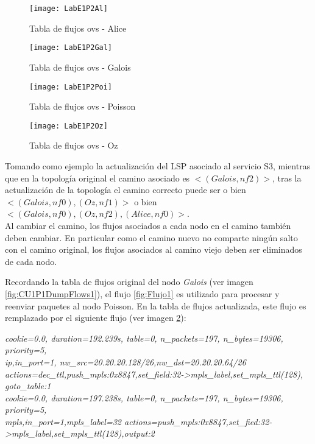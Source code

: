 \begin{figure}[h] 
\centering    
\texttt{[image: LabE1P2Al]}
\caption[Tabla de flujos ovs - Alice]{Tabla de flujos ovs - Alice}
\label{fig:CU1P2DumpFlows1}
\end{figure}

\newpage
\begin{figure}[h] 
\centering    
\texttt{[image: LabE1P2Gal]}
\caption[Tabla de flujos ovs - Galois]{Tabla de flujos ovs - Galois}
\label{fig:CU1P2DumpFlows2}
\end{figure}

\begin{figure}[h] 
\centering    
\texttt{[image: LabE1P2Poi]}
\caption[Tabla de flujos ovs - Poisson]{Tabla de flujos ovs - Poisson}
\label{fig:CU1P2DumpFlows3}
\end{figure}

\newpage
\begin{figure}[ht!] 
\centering    
\texttt{[image: LabE1P2Oz]}
\caption[Tabla de flujos ovs - Oz]{Tabla de flujos ovs - Oz}
\label{fig:CU1P2DumpFlows4}
\end{figure}

Tomando como ejemplo la actualizaci\'on del LSP asociado al servicio S3, mientras que en la topolog\'ia original el camino asociado es $<(Galois, nf2)>$, tras la actualizaci\'on de la topolog\'ia el camino correcto puede ser o bien $<(Galois, nf0),(Oz, nf1)>$ o bien \\ $<(Galois, nf0), (Oz, nf2), (Alice, nf0)>$.\\

Al cambiar el camino, los flujos asociados a cada nodo en el camino tambi\'en deben cambiar. En particular como el camino nuevo no comparte ning\'un salto con el camino original, los flujos asociados al camino viejo deben ser eliminados de cada nodo.

Recordando la tabla de flujos original del nodo \textit{Galois} (ver imagen \ref{fig:CU1P1DumpFlows1}), el flujo \ref{fig:Flujo1} es utilizado para procesar y reenviar paquetes al nodo Poisson. En la tabla de flujos actualizada, este flujo es remplazado por el siguiente flujo (ver imagen \ref{fig:CU1P2DumpFlows2}):

\begin{center}
\textit{cookie=0.0, duration=192.239s, table=0, n\_packets=197, n\_bytes=19306, priority=5, \\
ip,in\_port=1, nw\_src=20.20.20.128/26,nw\_dst=20.20.20.64/26 \\
actions=dec\_ttl,push\_mpls:0x8847,set\_field:32->mpls\_label,set\_mpls\_ttl(128), goto\_table:1 \\
cookie=0.0, duration=197.238s, table=0, n\_packets=197, n\_bytes=19306, priority=5, \\
mpls,in\_port=1,mpls\_label=32 actions=push\_mpls:0x8847,set\_fied:32->mpls\_label,set\_mpls\_ttl(128),output:2}
\end{center}

